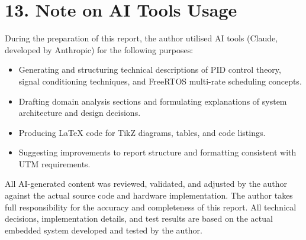 \documentclass[12pt]{article}
\begin{document}
\section*{13. Note on AI Tools Usage}

During the preparation of this report, the author utilised AI tools (Claude, developed by Anthropic)
for the following purposes:

\begin{itemize}
    \item Generating and structuring technical descriptions of PID control theory, signal conditioning
          techniques, and FreeRTOS multi-rate scheduling concepts.
    \item Drafting domain analysis sections and formulating explanations of system architecture and
          design decisions.
    \item Producing \LaTeX{} code for TikZ diagrams, tables, and code listings.
    \item Suggesting improvements to report structure and formatting consistent with UTM requirements.
\end{itemize}

All AI-generated content was reviewed, validated, and adjusted by the author against the actual
source code and hardware implementation. The author takes full responsibility for the accuracy and
completeness of this report. All technical decisions, implementation details, and test results are
based on the actual embedded system developed and tested by the author.
\end{document}
